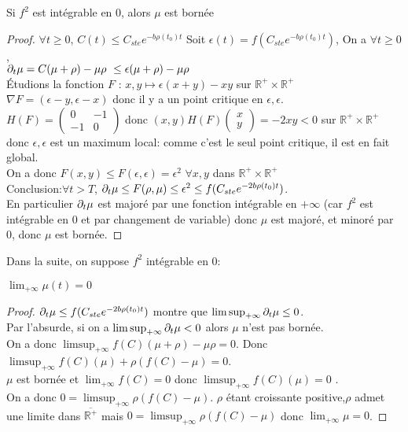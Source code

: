 \begin{lemma} Si $f^2$ est intégrable en 0, alors $\mu$ est bornée
\end{lemma}
\begin{proof} $\forall t\geq 0$, $C(t)\leq C_{ste}e^{-b \rho(t_0)t} $ Soit $\epsilon(t)=f(C_{ste}e^{-b \rho(t_0)t} )$, On a $\forall t\geq 0$,\\ $\partial_t\mu  = C(\mu + \rho) -\mu\rho\ \leq \epsilon(\mu + \rho) -\mu\rho$ \\
Étudions la fonction $F$ : $x,y \mapsto \epsilon(x + y) -xy$ sur $\mathbb{R}^+ \times \mathbb{R}^+$\\
$\nabla F = (\epsilon-y, \epsilon-x)$ donc il y a un point critique en $\epsilon,\epsilon$.\\
$H(F) = \begin{pmatrix}
   0 & -1 \\
   -1 & 0 
\end{pmatrix}$ donc $(x,y)H(F)\begin{pmatrix} x \\ y \end{pmatrix} = -2xy < 0$ sur $\mathbb{R}^+ \times \mathbb{R}^+$ donc $\epsilon,\epsilon$ est un maximum local: comme c'est le seul point critique, il est en fait global.\\
On a donc $F(x,y)\leq F(\epsilon,\epsilon) = \epsilon^2 $ $\forall x,y$ dans $\mathbb{R}^+ \times \mathbb{R}^+$\\
Conclusion:$\forall t>T$,  $\partial_t\mu \leq F(\rho,\mu) \leq  \epsilon^2 \leq f(C_{ste}e^{-2b \rho(t_0)t})$. \\En particulier $\partial_t\mu$ est majoré par une fonction intégrable en $+\infty$ (car $f^2$ est intégrable en 0 et par changement de variable) donc $\mu$ est majoré, et minoré par $0$, donc $\mu$ est bornée.
\end{proof}
Dans la suite, on suppose $f^2$ intégrable en 0:
\begin{lemma} $\lim_{+\infty} \mu(t) = 0$
\end{lemma}
\begin{proof}
$\partial_t\mu \leq f(C_{ste}e^{-2b \rho(t_0)t})$ montre que $\limsup _{+\infty}\partial_t\mu \leq 0$.\\
Par l'absurde, si on a $\limsup _{+\infty}\partial_t\mu <0$ alors $\mu$ n'est pas bornée.\\
On a donc $\limsup_{+\infty}f(C)(\mu + \rho) -\mu\rho = 0$.
Donc $\limsup_{+\infty} f(C)(\mu) + \rho ( f(C)-\mu) = 0$.\\ $\mu$ est bornée et $\lim_{+\infty}f(C)=0$ donc $\limsup_{+\infty} f(C)(\mu) =0$ .\\
On a donc $0=  \limsup_{+\infty} \rho (f(C)-\mu)$. $\rho$ étant croissante positive,$\rho$ admet une limite dans  $\overline{\mathbb{R^+}}$ mais $0=  \limsup_{+\infty} \rho (f(C)-\mu)$ donc $\lim_{+\infty}\mu =0$.
\end{proof} 